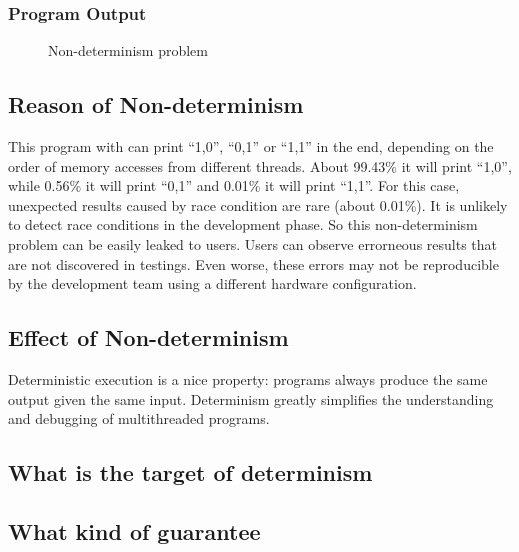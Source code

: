 \subsubsection{Program Output}

\begin{figure}[!ht]
{\centering
\fbox{
\subfigure{}
\hspace{12pt}
\subfigure{}
\hspace{12pt}
\subfigure{}
}
\caption{Non-determinism problem 
\label{fig:nondeterminism}}
}
\end{figure}

\subsection{Reason of Non-determinism}

\label{sec:nondeterminism}
This program with \pthreads{} can print ``1,0'', ``0,1'' or ``1,1'' in the end, 
depending on the order of memory accesses from different threads. 
About 99.43\% it will print ``1,0'', while 0.56\% it will print ``0,1''
and 0.01\% it will print ``1,1''.
For this case, unexpected results caused by race condition are rare (about 0.01\%). 
It is unlikely to detect race conditions in the development phase. 
So this non-determinism problem can be easily leaked to users.
Users can observe errorneous results that are not discovered in testings. 
Even worse, these errors may not be reproducible by the development team using
a different hardware configuration. 

\subsection{Effect of Non-determinism}

Deterministic execution is a nice property: programs always produce 
the same output given the same input.
Determinism greatly simplifies the understanding and debugging of multithreaded programs.

\subsection{What is the target of determinism}
\subsection{What kind of guarantee}
